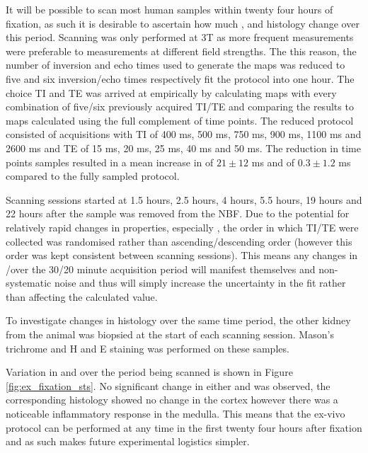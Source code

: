 It will be possible to scan most human samples within twenty four hours of fixation, as such it is desirable to ascertain how much \tone, \ttwostar and histology change over this period. Scanning was only performed at 3T as more frequent measurements were preferable to measurements at different field strengths. The this reason, the number of inversion and echo times used to generate the maps was reduced to five and six inversion/echo times respectively fit the protocol into one hour. The choice \ac{TI} and \ac{TE} was arrived at empirically by calculating maps with every combination of five/six previously acquired \ac{TI}/\ac{TE} and comparing the results to maps calculated using the full complement of time points. The reduced protocol consisted of acquisitions with \ac{TI} of 400 ms, 500 ms, 750 ms, 900 ms, 1100 ms and 2600 ms and \ac{TE} of 15 ms, 20 ms, 25 ms, 40 ms and 50 ms. The reduction in time points samples resulted in a mean increase in \tone of $21 \pm 12$ ms and \ttwostar of $0.3 \pm 1.2$ ms compared to the fully sampled protocol.

Scanning sessions started at 1.5 hours, 2.5 hours, 4 hours, 5.5 hours, 19 hours and 22 hours after the sample was removed from the \ac{NBF}. Due to the potential for relatively rapid changes in properties, especially \tone, the order in which \ac{TI}/\ac{TE} were collected was randomised rather than ascending/descending order (however this order was kept consistent between scanning sessions). This means any changes in \tone/\ttwostar over the 30/20 minute acquisition period will manifest themselves and non-systematic noise and thus will simply increase the uncertainty in the fit rather than affecting the calculated value.

To investigate changes in histology over the same time period, the other kidney from the animal was biopsied at the start of each scanning session. Mason's trichrome and \ac{H and E} staining was performed on these samples.

Variation in \tone and \ttwostar over the period being scanned is shown in Figure \ref{fig:ex_fixation_sts}. No significant change in either \tone and \ttwostar was observed, the corresponding histology showed no change in the cortex however there was a noticeable inflammatory response in the medulla. This means that the ex-vivo protocol can be performed at any time in the first twenty four hours after fixation and as such makes future experimental logistics simpler.

